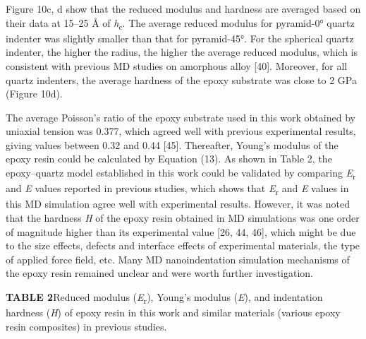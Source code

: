 \documentclass{article}
\begin{document}
Figure 10c, d show that the reduced modulus and hardness are averaged based on their data at 15–25 Å of \emph{h}\textsubscript{c}. The average reduced modulus for pyramid-0° quartz indenter was slightly smaller than that for pyramid-45°. For the spherical quartz indenter, the higher the radius, the higher the average reduced modulus, which is consistent with previous MD studies on amorphous alloy [40]. Moreover, for all quartz indenters, the average hardness of the epoxy substrate was close to 2 GPa (Figure 10d).

The average Poisson’s ratio of the epoxy substrate used in this work obtained by uniaxial tension was 0.377, which agreed well with previous experimental results, giving values between 0.32 and 0.44 [45]. Thereafter, Young’s modulus of the epoxy resin could be calculated by Equation (13). As shown in Table 2, the epoxy–quartz model established in this work could be validated by comparing \emph{E}\textsubscript{r} and \emph{E} values reported in previous studies, which shows that \emph{E}\textsubscript{r} and \emph{E} values in this MD simulation agree well with experimental results. However, it was noted that the hardness \emph{H} of the epoxy resin obtained in MD simulations was one order of magnitude higher than its experimental value [26, 44, 46], which might be due to the size effects, defects and interface effects of experimental materials, the type of applied force field, etc. Many MD nanoindentation simulation mechanisms of the epoxy resin remained unclear and were worth further investigation.

\noindent\textbf{TABLE 2}\quad Reduced modulus (\emph{E}\textsubscript{r}), Young’s modulus (\emph{E}), and indentation hardness (\emph{H}) of epoxy resin in this work and similar materials (various epoxy resin composites) in previous studies.
\end{document}

